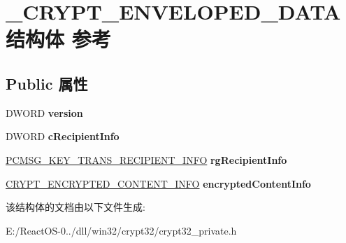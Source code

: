 \hypertarget{struct___c_r_y_p_t___e_n_v_e_l_o_p_e_d___d_a_t_a}{}\section{\+\_\+\+C\+R\+Y\+P\+T\+\_\+\+E\+N\+V\+E\+L\+O\+P\+E\+D\+\_\+\+D\+A\+T\+A结构体 参考}
\label{struct___c_r_y_p_t___e_n_v_e_l_o_p_e_d___d_a_t_a}
\subsection*{Public 属性}
\begin{DoxyCompactItemize}
\item 
\mbox{\label{struct___c_r_y_p_t___e_n_v_e_l_o_p_e_d___d_a_t_a_abe20a90f8690072eab44e44756ba4466}} 
D\+W\+O\+RD {\bfseries version}
\item 
\mbox{\label{struct___c_r_y_p_t___e_n_v_e_l_o_p_e_d___d_a_t_a_a157fd4856f869891104f0d8a6fa6a1f9}} 
D\+W\+O\+RD {\bfseries c\+Recipient\+Info}
\item 
\mbox{\label{struct___c_r_y_p_t___e_n_v_e_l_o_p_e_d___d_a_t_a_a6d36821d894078b21692bc132673707e}} 
\hyperlink{struct___c_m_s_g___k_e_y___t_r_a_n_s___r_e_c_i_p_i_e_n_t___i_n_f_o}{P\+C\+M\+S\+G\+\_\+\+K\+E\+Y\+\_\+\+T\+R\+A\+N\+S\+\_\+\+R\+E\+C\+I\+P\+I\+E\+N\+T\+\_\+\+I\+N\+FO} {\bfseries rg\+Recipient\+Info}
\item 
\mbox{\label{struct___c_r_y_p_t___e_n_v_e_l_o_p_e_d___d_a_t_a_a1bbfd768d101ee3722d07cc3508dea35}} 
\hyperlink{struct___c_r_y_p_t___e_n_c_r_y_p_t_e_d___c_o_n_t_e_n_t___i_n_f_o}{C\+R\+Y\+P\+T\+\_\+\+E\+N\+C\+R\+Y\+P\+T\+E\+D\+\_\+\+C\+O\+N\+T\+E\+N\+T\+\_\+\+I\+N\+FO} {\bfseries encrypted\+Content\+Info}
\end{DoxyCompactItemize}


该结构体的文档由以下文件生成\+:\begin{DoxyCompactItemize}
\item 
E\+:/\+React\+O\+S-\/0../dll/win32/crypt32/crypt32\+\_\+private.\+h\end{DoxyCompactItemize}
